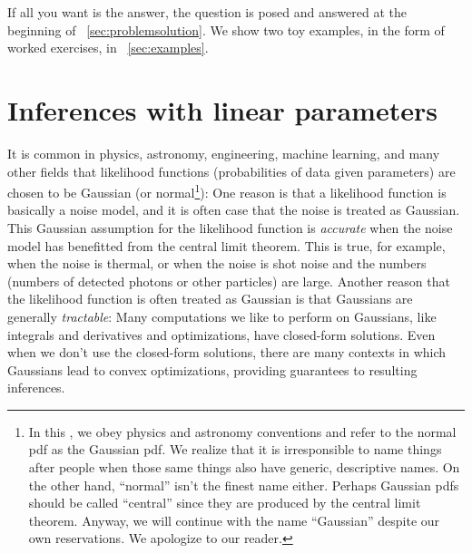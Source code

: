 If all you want is the answer, the question is posed and answered at the
beginning of \sectionname~\ref{sec:problemsolution}.
We show two toy examples, in the form of worked exercises, in
\sectionname~\ref{sec:examples}.


\section{Inferences with linear parameters}

It is common in physics, astronomy, engineering, machine learning, and many other fields that likelihood functions
(probabilities of data given parameters) are chosen to be Gaussian
(or normal\footnote{In this \documentname, we obey physics and astronomy
conventions and refer to the normal pdf as the Gaussian pdf. We realize that it
is irresponsible to name things after people when those same things also have generic,
descriptive names. On the other hand, ``normal'' isn't the finest name either.
Perhaps Gaussian pdfs should be called ``central'' since they are produced by
the central limit theorem. Anyway, we will continue with the name ``Gaussian''
despite our own reservations. We apologize to our reader.}):
One reason is that a likelihood function is basically a noise model,
and it is often case that the noise is treated as Gaussian.
This Gaussian assumption for the likelihood function is
\emph{accurate} when the noise model has benefitted from the central
limit theorem.
This is true, for example, when the noise is thermal, or when the
noise is shot noise and the numbers (numbers of detected photons or other
particles) are large.
Another reason that the likelihood function is often treated as
Gaussian is that Gaussians are generally \emph{tractable}:
Many computations we like to perform on Gaussians, like integrals and
derivatives and optimizations, have closed-form solutions.
Even when we don't use the closed-form solutions, there are many
contexts in which Gaussians lead to convex optimizations,
providing guarantees to resulting inferences.


